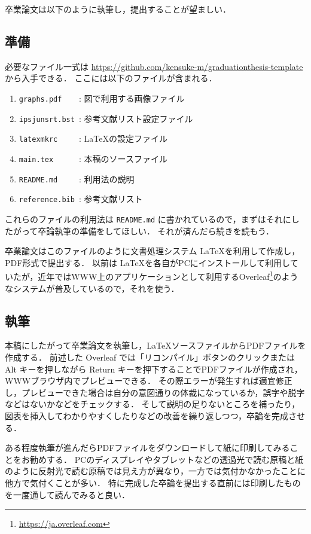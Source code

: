 \documentclass[a4paper,twocolumn,10pt]{jsarticle}
\begin{document}
卒業論文は以下のように執筆し，提出することが望ましい．

\subsection{準備}

必要なファイル一式は \url{https://github.com/kensuke-m/graduationthesis-template} から入手できる．
ここには以下のファイルが含まれる．
\begin{enumerate}
 \item \verb|graphs.pdf    |: 図で利用する画像ファイル
 \item \verb|ipsjunsrt.bst |: 参考文献リスト設定ファイル
 \item \verb|latexmkrc     |: \LaTeX の設定ファイル
 \item \verb|main.tex      |: 本稿のソースファイル
 \item \verb|README.md     |: 利用法の説明
 \item \verb|reference.bib |: 参考文献リスト
\end{enumerate}
これらのファイルの利用法は {\tt README.md} に書かれているので，まずはそれにしたがって卒論執筆の準備をしてほしい．
それが済んだら続きを読もう．

卒業論文はこのファイルのように文書処理システム \LaTeX を利用して作成し，PDF形式で提出する．
以前は \LaTeX を各自がPCにインストールして利用していたが，近年ではWWW上のアプリケーションとして利用するOverleaf\footnote{\url{https://ja.overleaf.com}}のようなシステムが普及しているので，それを使う．

\subsection{執筆}

本稿にしたがって卒業論文を執筆し，\LaTeX ソースファイルからPDFファイルを作成する．
前述した Overleaf では「リコンパイル」ボタンのクリックまたは Alt キーを押しながら Return キーを押下することでPDFファイルが作成され，WWWブラウザ内でプレビューできる．
その際エラーが発生すれば適宜修正し，プレビューできた場合は自分の意図通りの体裁になっているか，誤字や脱字などはないかなどをチェックする．
そして説明の足りないところを補ったり，図表を挿入してわかりやすくしたりなどの改善を繰り返しつつ，卒論を完成させる．

ある程度執筆が進んだらPDFファイルをダウンロードして紙に印刷してみることをお勧めする．
PCのディスプレイやタブレットなどの透過光で読む原稿と紙のように反射光で読む原稿では見え方が異なり，一方では気付かなかったことに他方で気付くことが多い．
特に完成した卒論を提出する直前には印刷したものを一度通して読んでみると良い．
\end{document}

